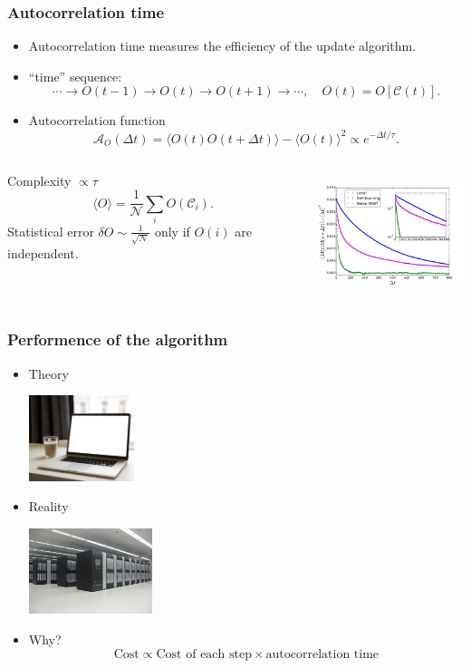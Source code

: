\documentclass[xcolor=table, 10pt, aspectratio=169]{beamer}
\begin{document}
\begin{frame}
  \frametitle{Autocorrelation time}
  \begin{itemize}
    \item Autocorrelation time measures the efficiency of the update algorithm.
    \item ``time'' sequence:
    \[\cdots\rightarrow O(t-1)\rightarrow O(t)\rightarrow O(t+1)\rightarrow\cdots,
  \quad O(t) = O[\mathcal C(t)].\]
    \item Autocorrelation function
    \[\mathcal A_O(\Delta t)=\langle O(t)O(t+\Delta t)\rangle - \langle O(t)\rangle^2\propto e^{-\Delta t/\tau}.\]
  \end{itemize}
  \begin{columns}
    \begin{block}{Complexity $\propto \tau$}
      \[\langle O\rangle = \frac1{\mathcal N}\sum_iO(\mathcal C_i).\]
      Statistical error $\delta O\sim\frac1{\sqrt{\mathcal N}}$ only if $O(i)$ are independent.
    \end{block}
    \centering
    \includegraphics[height=3.5cm]{auto_decay}
  \end{columns}
\end{frame}

\begin{frame}
  \frametitle{Performence of the algorithm}
    \begin{itemize}
      \item Theory
      \begin{center}
        \includegraphics[height=2.5cm]{laptop_coffee}
      \end{center}
      \item Reality
      \begin{center}
        \includegraphics[height=2.5cm]{tianhe}
      \end{center}
      \item Why?
      \[\text{Cost} \propto \text{Cost of each step} \times \text{autocorrelation time}\]
    \end{itemize}
\end{frame}
\end{document}
